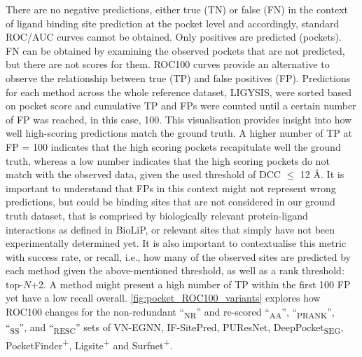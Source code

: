 There are no negative predictions, either true (TN) or false (FN) in the context of ligand binding site prediction at the pocket level and accordingly, standard ROC/AUC curves cannot be obtained. Only positives are predicted (pockets). FN can be obtained by examining the observed pockets that are not predicted, but there are not scores for them. ROC100 curves provide an alternative to observe the relationship between true (TP) and false positives (FP). Predictions for each method across the whole reference dataset, LIGYSIS, were sorted based on pocket score and cumulative TP and FPs were counted until a certain number of FP was reached, in this case, 100. This visualisation provides insight into how well high-scoring predictions match the ground truth. A higher number of TP at FP = 100 indicates that the high scoring pockets recapitulate well the ground truth, whereas a low number indicates that the high scoring pockets do not match with the observed data, given the used threshold of DCC $\leq$ 12 \AA{}. It is important to understand that FPs in this context might not represent wrong predictions, but could be binding sites that are not considered in our ground truth dataset, that is comprised by biologically relevant protein-ligand interactions as defined in BioLiP, or relevant sites that simply have not been experimentally determined yet. It is also important to contextualise this metric with success rate, or recall, i.e., how many of the observed sites are predicted by each method given the above-mentioned threshold, as well as a rank threshold: top-$N$+2. A method might present a high number of TP within the first 100 FP yet have a low recall overall. \autoref{fig:pocket_ROC100_variants} explores how ROC100 changes for the non-redundant ``\textsubscript{NR}'' and re-scored ``\textsubscript{AA}'', ``\textsubscript{PRANK}'', ``\textsubscript{SS}'', and ``\textsubscript{RESC}'' sets of VN-EGNN, IF-SitePred, PUResNet, DeepPocket\textsubscript{SEG}, PocketFinder\textsuperscript{+}, Ligsite\textsuperscript{+} and Surfnet\textsuperscript{+}.

